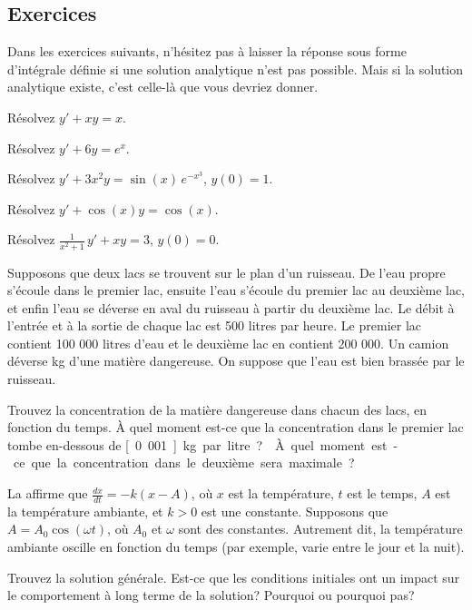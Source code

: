 \subsection{Exercices}

Dans les exercices suivants, n'hésitez pas à laisser la réponse sous forme d'intégrale définie si une solution analytique n'est pas possible.  Mais si la solution analytique existe, c'est celle-là que vous devriez donner.

\begin{exercise}
Résolvez $y' + xy = x$.
\end{exercise}

\begin{exercise}
Résolvez $y' + 6y = e^x$.
\end{exercise}

\begin{exercise}
Résolvez $y' + 3x^2y = \sin(x) \, e^{-x^3}$, $y(0) = 1$.
\end{exercise}

\begin{exercise}
Résolvez $y' + \cos (x) y = \cos(x)$.
\end{exercise}

\begin{exercise}
Résolvez $\frac{1}{x^2+1} \, y' + x y = 3$, $y(0) = 0$.
\end{exercise}

\begin{exercise}
Supposons que deux lacs se trouvent sur le plan d'un ruisseau. De l'eau propre s'écoule dans le premier lac, ensuite l'eau s'écoule du premier lac au deuxième lac, et enfin l'eau se déverse en aval du ruisseau à partir du deuxième lac. Le débit à l'entrée et à la sortie de chaque lac est 500 litres par heure.  Le premier lac contient 100 000 litres d'eau et le deuxième lac en contient 200 000.  Un camion déverse \unit[500]{kg} d'une matière dangereuse.  On suppose que l'eau est bien brassée par le ruisseau.
\begin{tasks}
\task Trouvez la concentration de la matière dangereuse dans chacun des lacs, en fonction du temps.
\task À quel moment est-ce que la 
concentration dans le premier lac tombe en-dessous de  \unit[0.001]{kg} par litre?
\task À quel moment est-ce que la concentration dans le deuxième sera maximale?
\end{tasks}
\end{exercise}

\begin{exercise}
La  affirme que $\frac{dx}{dt} = -k(x-A)$, où 
$x$ est la température, $t$ est le temps, $A$ est la température ambiante,
et $k > 0$ est une constante.
Supposons que $A = A_0 \cos (\omega t)$, où $A_0$ et $\omega$ sont des constantes.  Autrement dit, la température ambiante oscille en fonction du temps (par exemple, varie entre le jour et la nuit).
\begin{tasks}
\task Trouvez la solution générale.
\task Est-ce que les conditions initiales ont un impact sur le comportement à long terme de la solution?  Pourquoi ou pourquoi pas?
\end{tasks}
\end{exercise}

